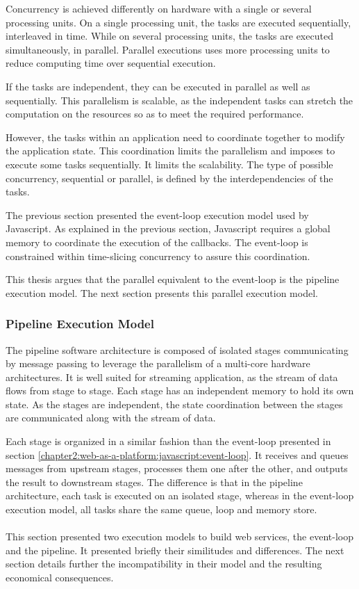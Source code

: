 Concurrency is achieved differently on hardware with a single or several processing units.
On a single processing unit, the tasks are executed sequentially, interleaved in time.
While on several processing units, the tasks are executed simultaneously, in parallel.
Parallel executions uses more processing units to reduce computing time over sequential execution.

If the tasks are independent, they can be executed in parallel as well as sequentially.
This parallelism is scalable, as the independent tasks can stretch the computation on the resources so as to meet the required performance.

However, the tasks within an application need to coordinate together to modify the application state.
This coordination limits the parallelism and imposes to execute some tasks sequentially.
It limits the scalability.
The type of possible concurrency, sequential or parallel, is defined by the interdependencies of the tasks.

The previous section presented the event-loop execution model used by Javascript.
As explained in the previous section, Javascript requires a global memory to coordinate the execution of the callbacks.
The event-loop is constrained within time-slicing concurrency to assure this coordination.

This thesis argues that the parallel equivalent to the event-loop is the pipeline execution model.
The next section presents this parallel execution model.

\subsubsection{Pipeline Execution Model}

The pipeline software architecture is composed of isolated stages communicating by message passing to leverage the parallelism of a multi-core hardware architectures.
It is well suited for streaming application, as the stream of data flows from stage to stage.
Each stage has an independent memory to hold its own state.
As the stages are independent, the state coordination between the stages are communicated along with the stream of data.


Each stage is organized in a similar fashion than the event-loop presented in section \ref{chapter2:web-as-a-platform:javascript:event-loop}.
It receives and queues messages from upstream stages, processes them one after the other, and outputs the result to downstream stages.
The difference is that in the pipeline architecture, each task is executed on an isolated stage, whereas in the event-loop execution model, all tasks share the same queue, loop and memory store.

\paragraph{}

This section presented two execution models to build web services, the event-loop and the pipeline.
It presented briefly their similitudes and differences.
The next section details further the incompatibility in their model and the resulting economical consequences.
